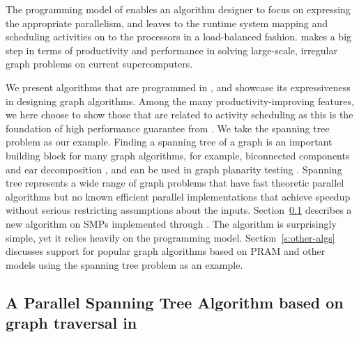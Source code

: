 The programming model of \Xten{} enables an algorithm designer to focus on expressing the appropriate parallelism, and leaves to the runtime system mapping and scheduling activities on to the processors in a load-balanced fashion. \Xten{} makes a big step in terms of productivity and performance in solving large-scale, irregular graph problems on current supercomputers.


 We present algorithms that are programmed in \Xten{}, and showcase its expressiveness in designing graph algorithms. Among the many productivity-improving features, we here choose to show those that are related to activity scheduling as this is the foundation of high performance guarantee from \Xten{}. 
We take the spanning tree problem as our example. Finding a spanning tree of a graph is an important building
block for many graph algorithms, for example, biconnected components
and ear decomposition \cite{MR86}, and can be used in graph planarity testing \cite{KR88}.
Spanning tree represents a wide range of graph problems that have fast
theoretic parallel algorithms but no known efficient
parallel implementations that achieve speedup without serious restricting assumptions about the inputs. 
Section~\ref{s:trav} describes a new algorithm on SMPs implemented through \Xten{}. The algorithm is surprisingly simple, yet it relies heavily on the \Xten{} programming model. Section~\ref{s:other-algs} discusses \Xten{} support for popular graph algorithms based on PRAM and other models using the spanning tree problem as an example.

 

\subsection{A Parallel Spanning Tree Algorithm based on graph traversal in \Xten{}}
\label{s:trav}

